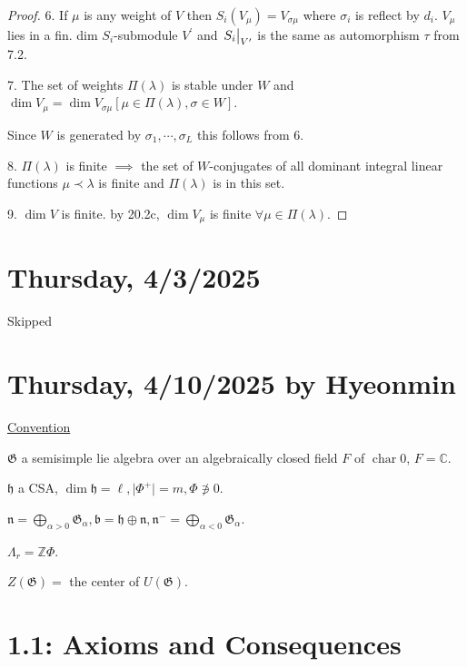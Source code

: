 \documentclass{article}
\theoremstyle{definition}
\begin{document}
\begin{proof}
        6. If \(\mu\) is any weight of \(V\) then \(S_i(V_\mu) = V_{\sigma \mu}\) where \(\sigma_i\) is reflect by \(d_i\). \(V_\mu\) lies in a fin. dim \(S_i\)-submodule \(V^{\prime}\) and \(\eval{S_i}_{V^{\prime}}\) is the same as automorphism \(\tau\) from 7.2.

        7. The set of weights \(\Pi(\lambda)\) is stable under \(W\) and \(\dim V_\mu = \dim V_{\sigma \mu} [\mu \in \Pi (\lambda), \sigma \in W]\).
        
        Since \(W\) is generated by \(\sigma_1 , \cdots , \sigma_L\) this follows from 6.

        8. \(\Pi(\lambda)\) is finite \(\implies\) the set of \(W\)-conjugates of all dominant integral linear functions \(\mu \prec \lambda\) is finite and \(\Pi(\lambda)\) is in this set.

        9. \(\dim V\) is finite. by 20.2c, \(\dim V_\mu\) is finite \(\forall \mu \in \Pi(\lambda)\). 

    \end{proof}

    \section{Thursday, 4/3/2025}
    
    Skipped

    \section{Thursday, 4/10/2025 by Hyeonmin}
    
    \underline{Convention} 

    \(\mathfrak{G}\) a semisimple lie algebra over an algebraically closed field \(F\) of \(\operatorname{char} 0\), \(F = \mathbb{C}\).

    \(\mathfrak{h}\) a CSA, \(\dim \mathfrak{h} = \ell, \vert \Phi ^+ \vert = m, \Phi \not\ni 0\).
    
    \(\mathfrak{n} = \bigoplus_{\alpha > 0} \mathfrak{G}_\alpha , \mathfrak{b} = \mathfrak{h} \oplus \mathfrak{n}, \mathfrak{n}^- = \bigoplus_{\alpha < 0} \mathfrak{G}_\alpha\).
    
    \(\Lambda_r = \mathbb{Z} \Phi\).

    \(Z(\mathfrak{G}) =\) the center of \(U(\mathfrak{G})\). 

    \section*{1.1: Axioms and Consequences}
\end{document}
